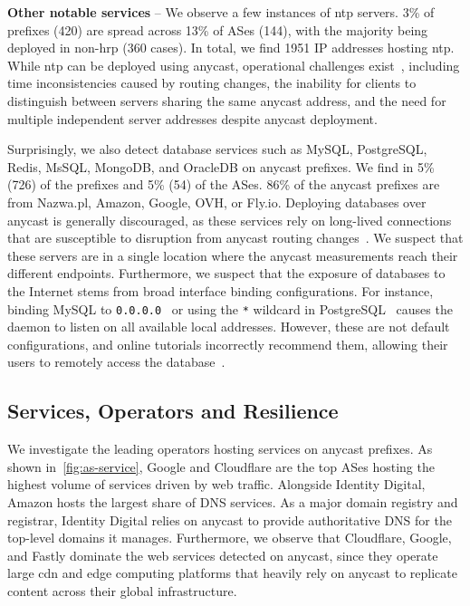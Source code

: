 \vspace{0.2em}\noindent\textbf{Other notable services} --
We observe a few instances of \gls{ntp} servers.
3\% of prefixes (420) are spread across 13\% of ASes (144), with the majority being deployed in non-\gls{hrp} (360 cases). In total, we find \num{1951} IP addresses hosting \gls{ntp}\@.
While \gls{ntp} can be deployed using anycast, operational challenges exist~\cite{rfc8633}, including time inconsistencies caused by routing changes, the inability for clients to distinguish between servers sharing the same anycast address, and the need for multiple independent server addresses despite anycast deployment.

Surprisingly, we also detect
database services such as MySQL, PostgreSQL, Redis, MsSQL, MongoDB, and OracleDB on anycast prefixes.
We find in 5\% (726) of the prefixes and 5\% (54) of the ASes.
86\% of the anycast prefixes are from Nazwa.pl, Amazon, Google, OVH, or Fly.io.
Deploying databases over anycast is generally discouraged, as these services rely on long-lived connections that are susceptible to disruption from anycast routing changes~\cite{rfc4786}.
We suspect that these servers are in a single location where the anycast \dataset measurements reach their different endpoints.
Furthermore, we suspect that the exposure of databases to the Internet stems from broad interface binding configurations.
For instance, binding MySQL to \texttt{0.0.0.0}~\cite{_MySQLMySQLRouter_} or using the \texttt{*} wildcard in PostgreSQL~\cite{_193ConnectionsAuthentication_2026} causes the daemon to listen on all available local addresses.
However, these are not default configurations, and online tutorials incorrectly recommend them, allowing their users to remotely access the database~\cite{_HowAllowRemote_}.

\subsection{Services, Operators and Resilience}
We investigate the leading operators hosting services on anycast prefixes.
As shown in~\cref{fig:as-service}, Google and Cloudflare are the top ASes hosting the highest volume of services driven by web traffic.
Alongside Identity Digital, 
Amazon hosts the largest share of DNS services.
As a major domain registry and registrar, Identity Digital relies on anycast to provide authoritative DNS for the top-level domains it manages.
Furthermore, we observe that Cloudflare, Google, and Fastly dominate the web services detected on anycast, since they operate large \gls{cdn} and edge computing platforms that heavily rely on anycast to replicate content across their global infrastructure.

